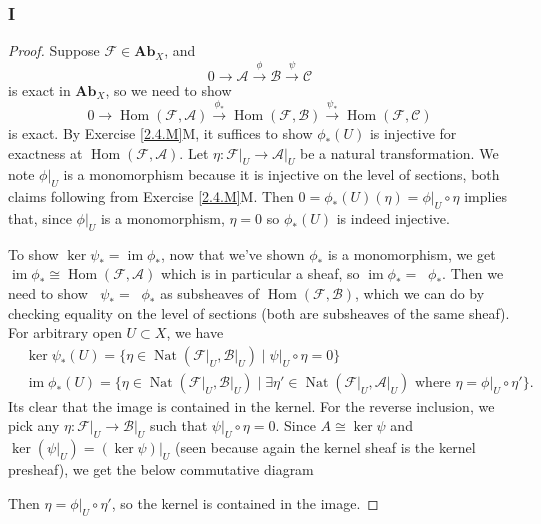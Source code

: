 \documentclass{article}
\newcommand{\fA}{\mathscr{A}}
\newcommand{\fB}{\mathscr{B}}
\newcommand{\fC}{\mathscr{C}}
\newcommand{\fF}{\mathscr{F}}
\newcommand{\Ab}{\mathbf{Ab}} %
\DeclareMathOperator{\im}{\mathrm{im}}
\DeclareMathOperator{\Hom}{\mathrm{Hom}}
\DeclareMathOperator{\Nat}{\mathrm{Nat}}
\DeclareMathOperator{\kerpre}{\ker_{\text{pre}}}
\DeclareMathOperator{\impre}{\im_{\text{pre}}}
\begin{document}
\subsubsection{I}\label{2.6.I}
\begin{proof}
    Suppose $\fF\in \Ab_X$, and
    \[
    0\to \fA \xrightarrow{\phi} \fB \xrightarrow{\psi} \fC
    \]
    is exact in $\Ab_X$, so we need to show
    \[
    0 \to \Hom(\fF,\fA) \xrightarrow{\phi_*} \Hom(\fF, \fB) \xrightarrow{\psi_*} \Hom(\fF,\fC)
    \]
    is exact. By Exercise \ref{2.4.M}M, it suffices to show $\phi_*(U)$ is injective for exactness at $\Hom(\fF,\fA)$. Let $\eta:\fF\vert_U \to \fA \vert_U$ be a natural transformation. We note $\phi\vert_U$ is a monomorphism because it is injective on the level of sections, both claims following from Exercise \ref{2.4.M}M. Then $0=\phi_*(U)(\eta)=\phi\vert_U\circ \eta$ implies that, since $\phi\vert_U$ is a monomorphism,  $\eta = 0$ so $\phi_*(U)$ is indeed injective.

    To show $\ker \psi_* = \im \phi_*$, now that we've shown $\phi_*$ is a monomorphism, we get $\im \phi_* \cong \Hom(\fF, \fA)$ which is in particular a sheaf, so $\im \phi_* = \impre \phi_*$. Then we need to show $\kerpre \psi_* = \impre \phi_*$ as subsheaves of $\Hom(\fF, \fB)$, which we can do by checking equality on the level of sections (both are subsheaves of the same sheaf). For arbitrary open $U\subset X$, we have
    \begin{align*}
        &\ker \psi_*(U) = \{\eta \in \Nat(\fF\vert_U, \fB\vert_U) \mid \psi\vert_U \circ \eta = 0\}\\
        &\im \phi_*(U) = \{\eta \in \Nat(\fF \vert_U, \fB\vert_U) \mid \exists \eta' \in \Nat(\fF\vert_U,\fA\vert_U) \text{ where } \eta = \phi\vert_U \circ \eta'\}.
    \end{align*}
    Its clear that the image is contained in the kernel. For the reverse inclusion, we pick any $\eta:\fF\vert_U \to \fB\vert_U$ such that $\psi\vert_U \circ \eta = 0$. Since $A\cong \ker \psi$ and $\ker (\psi \vert_U) = (\ker \psi)\vert_U$ (seen because again the kernel sheaf is the kernel presheaf), we get the below commutative diagram
    \begin{center}
    \end{center}
    Then $\eta = \phi \vert_U \circ \eta'$, so the kernel is contained in the image.


\end{proof}
\end{document}
